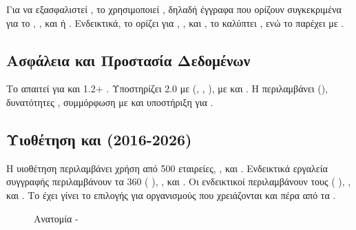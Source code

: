 Για να εξασφαλιστεί , το  χρησιμοποιεί , δηλαδή έγγραφα που ορίζουν συγκεκριμένα  για το ,  ,   και  ή . Ενδεικτικά, το   ορίζει  για , ,  και , το    καλύπτει  , ενώ το   παρέχει   με .

\subsection{Ασφάλεια και Προστασία Δεδομένων}
\label{subsec:xapi_security}

Το  απαιτεί  για  και  1.2+ . Υποστηρίζει  2.0 με  (, , ),   με  και  . Η  περιλαμβάνει   (), δυνατότητες , συμμόρφωση με  και υποστήριξη για   .

\subsection{Υιοθέτηση και  (2016-2026)}
\label{subsec:xapi_adoption}

Η υιοθέτηση περιλαμβάνει χρήση από  500 εταιρείες,  ,    και   . Ενδεικτικά εργαλεία συγγραφής περιλαμβάνουν τα   360 ( ),  ,    και . Οι ενδεικτικοί   περιλαμβάνουν τους   ( ),   ,   και  . Το  έχει γίνει το  επιλογής για οργανισμούς που χρειάζονται    και  πέρα από τα   .

\begin{figure}[H]
  \centering
  
  \caption{Ανατομία   -  }
  \label{fig:xapi_statement}
\end{figure}

